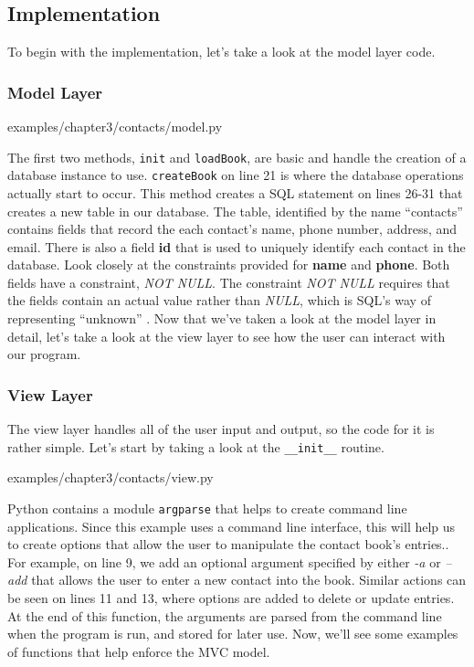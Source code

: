 \documentclass[12pt, oneside, a4paper]{book}
\begin{document}
      \subsection{Implementation}
      To begin with the implementation, let's take a look at the model layer code.

      \subsubsection{Model Layer}
      
      {examples/chapter3/contacts/model.py}

      The first two methods, \lstinline!init! and \lstinline!loadBook!, are basic and handle the creation of a database instance to use.
      \lstinline!createBook! on line 21 is where the database operations actually start to occur.
      This method creates a SQL statement on lines 26-31 that creates a new table in our database.
      The table, identified by the name ``contacts'' contains fields that record the each contact's name, phone number, address, and email.
      There is also a field \textbf{id} that is used to uniquely identify each contact in the database.
      Look closely at the constraints provided for \textbf{name} and \textbf{phone}.
      Both fields have a constraint, \textit{NOT NULL}.
      The constraint \textit{NOT NULL} requires that the fields contain an actual value rather than \textit{NULL}, which is SQL's way of representing ``unknown'' \autocite{SQLiteSyntaxColumnconstraint}.
      Now that we've taken a look at the model layer in detail, let's take a look at the view layer to see how the user can interact with our program.

      \subsubsection{View Layer}
      The view layer handles all of the user input and output, so the code for it is rather simple.
      Let's start by taking a look at the \lstinline!__init__! routine.

      
      {examples/chapter3/contacts/view.py}

      Python contains a module \lstinline!argparse! that helps to create command line applications.
      Since this example uses a command line interface, this will help us to create options that allow the user to manipulate the contact book's entries..
      For example,  on line 9, we add an optional argument specified by either \textit{-a} or \textit{--add} that allows the user to enter a new contact into the book.
      Similar actions can be seen on lines 11 and 13, where options are added to delete or update entries.
      At the end of this function, the arguments are parsed from the command line when the program is run, and stored for later use.
      Now, we'll see some examples of functions that help enforce the MVC model.
\end{document}
